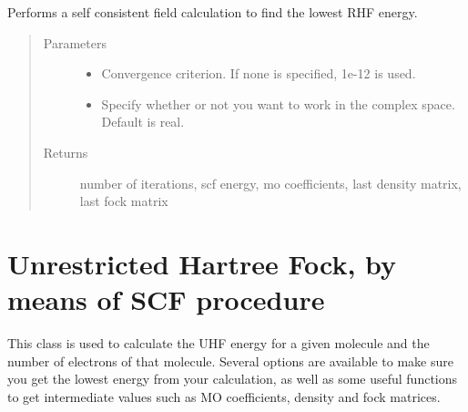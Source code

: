 \documentclass[letterpaper,10pt,english]{sphinxmanual}
\begin{document}
\begin{fulllineitems}
\begin{fulllineitems}
\label{\detokenize{RHF:hf.RHF.RHF.scf}}
Performs a self consistent field calculation to find the lowest RHF energy.
\begin{quote}\begin{description}
\item[{Parameters}] \leavevmode\begin{itemize}
\item {} 
 \textendash{} Convergence criterion. If none is specified, 1e-12 is used.

\item {} 
 \textendash{} Specify whether or not you want to work in the complex space. Default is real.

\end{itemize}

\item[{Returns}] \leavevmode
number of iterations, scf energy, mo coefficients, last density matrix, last fock matrix

\end{description}\end{quote}

\end{fulllineitems}


\end{fulllineitems}

\label{\detokenize{UHF:module-hf.UHF}}

\chapter{Unrestricted Hartree Fock, by means of SCF procedure}
\label{\detokenize{UHF:unrestricted-hartree-fock-by-means-of-scf-procedure}}\label{\detokenize{UHF::doc}}
This class is used to calculate the UHF energy for a given molecule and the number of electrons of that molecule.
Several options are available to make sure you get the lowest energy from your calculation, as well as some useful
functions to get intermediate values such as MO coefficients, density and fock matrices.
\end{document}
